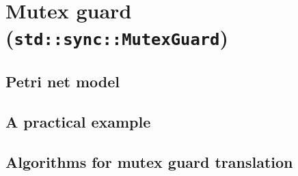 \section{Mutex guard (\texttt{std::sync::MutexGuard})}

\subsection{Petri net model}

\subsection{A practical example}

\subsection{Algorithms for mutex guard translation}
\label{sec:mutex-guard-algorithms}